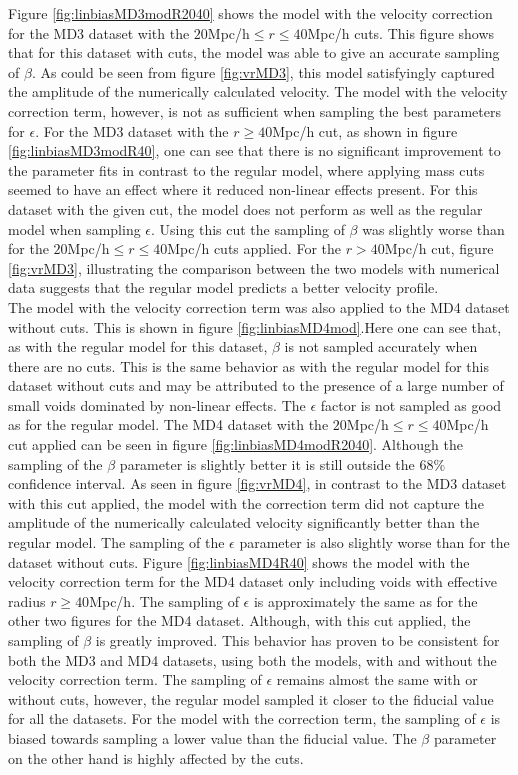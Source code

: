 Figure \ref{fig:linbiasMD3modR2040} shows the model with the velocity correction for the MD3 dataset with the $20$Mpc/h$\leq r\leq 40$Mpc/h cuts. This figure shows that for this dataset with cuts, the model was able to give an accurate sampling of $\beta$. As could be seen from figure \ref{fig:vrMD3}, this model satisfyingly captured the amplitude of the numerically calculated velocity. The model with the velocity correction term, however, is not as sufficient when sampling the best parameters for $\epsilon$. For the MD3 dataset with the $r \geq 40$Mpc/h cut, as shown in figure \ref{fig:linbiasMD3modR40}, one can see that there is no significant improvement to the parameter fits in contrast to the regular model, where applying mass cuts seemed to have an effect where it reduced non-linear effects present. For this dataset with the given cut, the model does not perform as well as the regular model when sampling $\epsilon$. Using this cut the sampling of $\beta$ was slightly worse than for the $20$Mpc/h$\leq r\leq 40$Mpc/h cuts applied. For the $r>40$Mpc/h cut, figure \ref{fig:vrMD3}, illustrating the comparison between the two models with numerical data suggests that the regular model predicts a better velocity profile.\\\indent
The model with the velocity correction term was also applied to the MD4 dataset without cuts. This is shown in figure \ref{fig:linbiasMD4mod}.Here one can see that, as with the regular model for this dataset, $\beta$ is not sampled accurately when there are no cuts. 
This is the same behavior as with the regular model for this dataset without cuts and may be attributed to the presence of a large number of small voids dominated by non-linear effects. The $\epsilon$ factor is not sampled as good as for the regular model. The MD4 dataset with the $20$Mpc/h$\leq r\leq 40$Mpc/h cut applied can be seen in figure \ref{fig:linbiasMD4modR2040}. Although the sampling of the $\beta$ parameter is slightly better it is still outside the $68\%$ confidence interval. As seen in figure \ref{fig:vrMD4}, in contrast to the MD3 dataset with this cut applied, the model with the correction term did not capture the amplitude of the numerically calculated velocity significantly better than the regular model. The sampling of the $\epsilon$ parameter is also slightly worse than for the dataset without cuts. Figure \ref{fig:linbiasMD4R40} shows the model with the velocity correction term for the MD4 dataset only including voids with effective radius $r\geq 40$Mpc/h. The sampling of $\epsilon$ is approximately the same as for the other two figures for the MD4 dataset. Although, with this cut applied, the sampling of $\beta$ is greatly improved. This behavior has proven to be consistent for both the MD3 and MD4 datasets, using both the models, with and without the velocity correction term. The sampling of $\epsilon$ remains almost the same with or without cuts, however, the regular model sampled it closer to the fiducial value for all the datasets. For the model with the correction term, the sampling of $\epsilon$ is biased towards sampling a lower value than the fiducial value. The $\beta$ parameter on the other hand is highly affected by the cuts.

